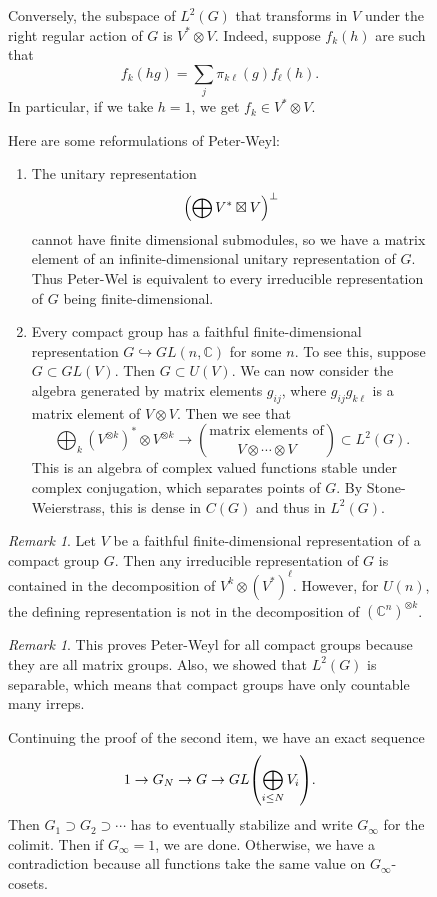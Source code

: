 \documentclass[leqno, openany]{memoir}
\theoremstyle{definition}
\theoremstyle{remark}
\newtheorem{rmk}[thm]{Remark}
\theoremstyle{plain}
\theoremstyle{definition}
\theoremstyle{remark}
\newcommand{\C}{\mathbb{C}}
\begin{document}
\begin{figure}[H]
Conversely, the subspace of $L^2(G)$ that transforms in $V$ under the right
regular action of $G$ is $V^* \otimes V$. Indeed, suppose $f_k(h)$ are such
that \[ f_k(hg) = \sum_j \pi_{k \ell}(g) f_{\ell}(h). \] In particular, if we
take $h = 1$, we get $f_k \in V^* \otimes V$.

Here are some reformulations of Peter-Weyl: \begin{enumerate} \item The unitary
    representation \[ \qty( \bigoplus V^* \boxtimes V )^{\perp} \] cannot have
    finite dimensional submodules, so we have a matrix element of an
    infinite-dimensional unitary representation of $G$. Thus Peter-Wel is
    equivalent to every irreducible representation of $G$ being
    finite-dimensional.  \item Every compact group has a faithful
    finite-dimensional representation $G \hookrightarrow GL(n, \C)$ for some
    $n$. To see this, suppose $G \subset GL(V)$. Then $G \subset U(V)$. We can
    now consider the algebra generated by matrix elements $g_{ij}$, where
    $g_{ij} g_{k\ell}$ is a matrix element of $V \otimes V$. Then we see that
    \[ \bigoplus_{k} (V^{\otimes k})^* \otimes V^{\otimes k} \longrightarrow
    \binom{\text{matrix elements of}}{V \otimes \cdots \otimes V}  \subset
L^2(G). \] This is an algebra of complex valued functions stable under complex
conjugation, which separates points of $G$. By Stone-Weierstrass, this is dense
in $C(G)$ and thus in $L^2(G)$.  \end{enumerate}

\begin{rmk} Let $V$ be a faithful finite-dimensional representation of a
    compact group $G$. Then any irreducible representation of $G$ is contained
    in the decomposition of $V^k \otimes (V^*)^{\ell}$. However, for $U(n)$,
    the defining representation is not in the decomposition of $(\C^n)^{\otimes
    k}$.  \end{rmk}

\begin{rmk} This proves Peter-Weyl for all compact groups because they are all
matrix groups. Also, we showed that $L^2(G)$ is separable, which means that
compact groups have only countable many irreps.  \end{rmk}

Continuing the proof of the second item, we have an exact sequence \[ 1 \to G_N
\to G \to GL \qty(\bigoplus_{i \leq N} V_i). \] Then $G_1 \supset G_2 \supset
\cdots $ has to eventually stabilize and write $G_{\infty}$ for the colimit.
Then if $G_{\infty} = 1$, we are done. Otherwise, we have a contradiction
because all functions take the same value on $G_{\infty}$-cosets.


\end{figure}
\end{document}
